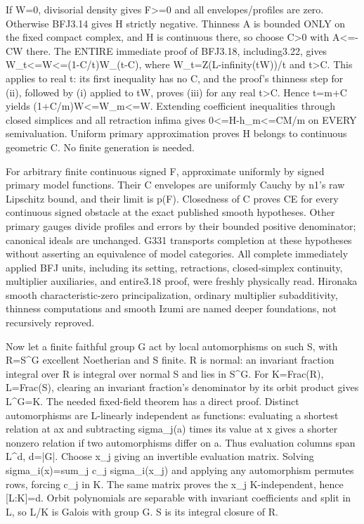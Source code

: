 If W=0, divisorial density gives F\textgreater{}=0 and all envelopes/profiles are zero. Otherwise BFJ3.14 gives H strictly negative. Thinness A is bounded ONLY on the fixed compact complex, and H is continuous there, so choose C\textgreater{}0 with A\textless{}=-CW there. The ENTIRE immediate proof of BFJ3.18, including3.22, gives W\_t\textless{}=W\textless{}=(1-C/t)W\_(t-C), where W\_t=Z(L-infinity(tW))/t and t\textgreater{}C. This applies to real t: its first inequality has no C, and the proof's thinness step for (ii), followed by (i) applied to tW, proves (iii) for any real t\textgreater{}C. Hence t=m+C yields (1+C/m)W\textless{}=W\_m\textless{}=W. Extending coefficient inequalities through closed simplices and all retraction infima gives 0\textless{}=H-h\_m\textless{}=CM/m on EVERY semivaluation. Uniform primary approximation proves H belongs to continuous geometric C. No finite generation is needed.

For arbitrary finite continuous signed F, approximate uniformly by signed primary model functions. Their C envelopes are uniformly Cauchy by n1's raw Lipschitz bound, and their limit is p(F). Closedness of C proves CE for every continuous signed obstacle at the exact published smooth hypotheses. Other primary gauges divide profiles and errors by their bounded positive denominator; canonical ideals are unchanged. G331 transports completion at these hypotheses without asserting an equivalence of model categories. All complete immediately applied BFJ units, including its setting, retractions, closed-simplex continuity, multiplier auxiliaries, and entire3.18 proof, were freshly physically read. Hironaka smooth characteristic-zero principalization, ordinary multiplier subadditivity, thinness computations and smooth Izumi are named deeper foundations, not recursively reproved.

Now let a finite faithful group G act by local automorphisms on such S, with R=S\textasciicircum{}G excellent Noetherian and S finite. R is normal: an invariant fraction integral over R is integral over normal S and lies in S\textasciicircum{}G. For K=Frac(R), L=Frac(S), clearing an invariant fraction's denominator by its orbit product gives L\textasciicircum{}G=K. The needed fixed-field theorem has a direct proof. Distinct automorphisms are L-linearly independent as functions: evaluating a shortest relation at ax and subtracting sigma\_j(a) times its value at x gives a shorter nonzero relation if two automorphisms differ on a. Thus evaluation columns span L\textasciicircum{}d, d=|G|. Choose x\_j giving an invertible evaluation matrix. Solving sigma\_i(x)=sum\_j c\_j sigma\_i(x\_j) and applying any automorphism permutes rows, forcing c\_j in K. The same matrix proves the x\_j K-independent, hence [L:K]=d. Orbit polynomials are separable with invariant coefficients and split in L, so L/K is Galois with group G. S is its integral closure of R.

